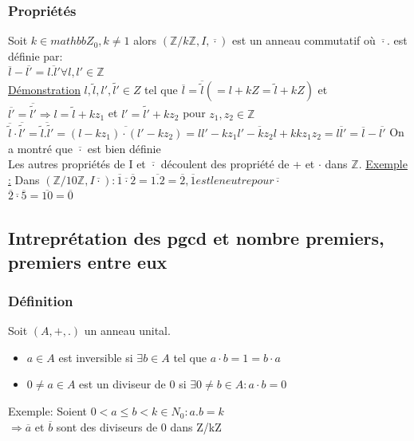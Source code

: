 \documentclass[11pt]{article}
\begin{document}
			 \subsubsection{Propriétés}
				Soit $k \in mathbb Z_0, k \neq 1$ alors $(\mathbb Z /k \mathbb Z, I, \overline{\cdot})$ est un anneau commutatif où $\overline{\cdot}.$ est définie par:\\
					$\overline{l} - \overline{l'} = \overline{l.l'}  \forall l, l' \in \mathbb Z$\\
					
				\underline{Démonstration}
					$l, \tilde{l}, l', \tilde{l'} \in Z$ tel que $\overline{l} = \overline{\tilde{l}} (= l + kZ = \tilde{l} + kZ)$ et $\overline{l'} = \overline{\tilde{l'}} \Rightarrow l = \tilde{l} + k z_1$ et $l' = \tilde{l'} + k z_2$ pour $z_1, z_2 \in \mathbb Z$\\
					$\overline{\tilde{l}}\cdot\overline{\tilde{l'}} = \overline{\tilde{l}.\tilde{l'}} = \overline{(l-kz_1) \cdot (l'-kz_2)} = \overline{l l' - k z_1 l' - k z_2 l + k k z_1 z_2} = \overline{ll'} = \overline{l} - \overline{l'}$
					On a montré que $\overline{\cdot}$ est bien définie\\
			
				Les autres propriétés de I et $\overline{\cdot}$ découlent des propriété de + et $\cdot$ dans $\mathbb Z$.
					\underline{Exemple :}
			Dans $(\mathbb Z/10\mathbb Z, I \overline{\cdot}): \overline{1} \overline{\cdot} \overline{2} = \overline{1.2} = \overline{2}, \overline{1} est le neutre pour \overline{\cdot}$\\
			$\overline{2} \overline{\cdot} \overline{5} = \overline{10} = \overline{0}$
			
		\subsection{Intreprétation des pgcd et nombre premiers, premiers entre eux}
			\subsubsection{Définition}
				Soit $(A, +, .)$ un anneau unital.\\
				\begin{itemize}
					 \item $a \in A$ est inversible si $\exists b \in A$ tel que $a \cdot b = 1 = b \cdot a$
					 \item $0 \neq a \in A$ est un diviseur de 0 si $\exists 0 \neq b \in A: a \cdot b = 0$
				\end{itemize}
				Exemple:
					Soient $0 < a \leq b < k \in N_0 : a.b = k$\\
					$\Rightarrow \overline{a}$ et $\overline{b}$ sont des diviseurs de 0 dans Z/kZ
					
\end{document}
